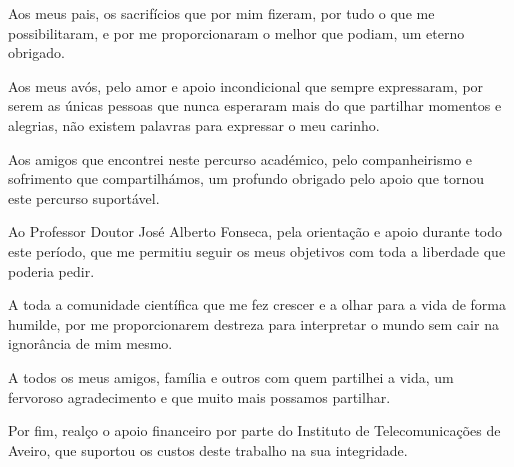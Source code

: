 Aos meus pais, os sacrifícios que por mim fizeram, por tudo o que me possibilitaram, e por me proporcionaram o melhor que podiam, um eterno obrigado.

Aos meus avós, pelo amor e apoio incondicional que sempre expressaram, por serem as únicas pessoas que nunca esperaram mais do que partilhar momentos e alegrias, não existem palavras para expressar o meu carinho.

Aos amigos que encontrei neste percurso académico, pelo companheirismo e sofrimento que compartilhámos, um profundo obrigado pelo apoio que tornou este percurso suportável.

Ao Professor Doutor José Alberto Fonseca, pela orientação e apoio durante todo este período, que me permitiu seguir os meus objetivos com toda a liberdade que poderia pedir.

A toda a comunidade científica que me fez crescer e a olhar para a vida de forma humilde, por me proporcionarem destreza para interpretar o mundo sem cair na ignorância de mim mesmo.

A todos os meus amigos, família e outros com quem partilhei a vida, um fervoroso agradecimento e que muito mais possamos partilhar.

Por fim, realço o apoio financeiro por parte do Instituto de Telecomunicações de Aveiro, que suportou os custos deste trabalho na sua integridade.